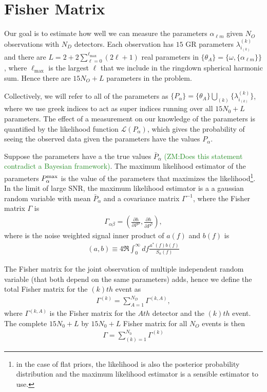 \documentclass[aps,prd,amsmath,showpacs,amssymb,superscriptaddress,nofootinbib,longbibliography,eqsecnum,preprintnumbers]{revtex4-1}
\newcommand{\zach}[1]{\textcolor{ForestGreen}{#1}}
\begin{document}
\section{Fisher Matrix}

Our goal is to estimate how well we can measure the parameters $\alpha_{\ell m}$ given $N_O$ observations with $N_D$ detectors. Each observation has $15$ GR parameters $\lambda^{(k)}_{i_{(k)}}$ and there are $L=2+2\sum_{\ell= 0}^{\ell_\text{max}}(2\ell+1)$ real parameters in $\{\theta_A\}=\{\omega,\{\alpha_{\ell m}\}\}$, where $
\ell_{\text{max}}$ is the largest $\ell$ that we include in the ringdown spherical harmonic sum. Hence there are $15N_O+L$ parameters in the problem.

Collectively, we will refer to all of the parameters as $\{P_\alpha\}=\{\theta_A\}\bigcup_{(k)}\{\lambda^{(k)}_{i_{(k)}}\}$, where we use greek indices to act as super indices running over all $15N_0+L$ parameters.
The effect of a measurement on our knowledge of the parameters is quantified by the likelihood function $\mathcal{L}(P_\alpha)$, which gives the probability of seeing the observed data given the parameters have the values $P_\alpha$.

Suppose the parameters have a the true values $\bar P_\alpha$ \zach{(ZM:Does this statement contradict a Bayesian framework)}. The maximum likelihood estimator of the parameters $P_\alpha^{\rm max}$ is the value of the parameters that maximizes the likelihood\footnote{in the case of flat priors, the likelihood is also the posterior probability distribution and the maximum likelihood estimator is a sensible estimator to use.}. In the limit of large SNR, the maximum likelihood estimator is a a gaussian random variable with mean $\bar P_\alpha$ and a covariance matrix $\Gamma^{-1}$, where the Fisher matrix $\Gamma$ is 
\begin{align}
\Gamma_{\alpha\beta}=\left(\frac{\partial h}{\partial P^{\alpha}},\frac{\partial h}{\partial P^{\beta}}\right),
\end{align}
where is the noise weighted signal inner product of $a(f)$ and $b(f)$ is
\begin{align}
(a,b)\equiv 4\Re\int_0^\infty df\frac{a^*(f)b(f)}{S_n(f)}
\end{align}

The Fisher matrix for the joint observation of multiple independent random variable (that both depend on the same parameters) adds, hence we define the total Fisher matrix for the $(k)th$ event as 
\begin{align}
\Gamma^{(k)}=\sum_{A=1}^{N_D}\Gamma^{(k,A)},
\end{align}
where $\Gamma^{(k,A)}$ is the Fisher matrix for the $Ath$ detector and the $(k)th$ event. The complete $15 N_0+L$ by $15 N_0+L$ Fisher matrix for all $N_O$ events is then
\begin{align}
\Gamma =\sum_{(k)=1}^{N_0}\Gamma^{(k)}
\end{align}
\end{document}
